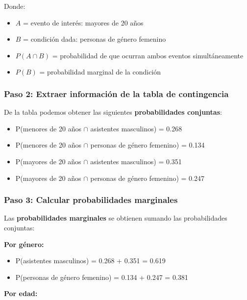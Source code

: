 \documentclass[
]{article}
\providecommand{\tightlist}{%
  \setlength{\itemsep}{0pt}\setlength{\parskip}{0pt}}
\begin{document}
Donde:

\begin{itemize}
\tightlist
\item
  \(A\) = evento de interés: mayores de 20 años
\item
  \(B\) = condición dada: personas de género femenino
\item
  \(P(A \cap B)\) = probabilidad de que ocurran ambos eventos
  simultáneamente
\item
  \(P(B)\) = probabilidad marginal de la condición
\end{itemize}

\subsubsection{Paso 2: Extraer información de la tabla de
contingencia}\label{paso-2-extraer-informaciuxf3n-de-la-tabla-de-contingencia}

De la tabla podemos obtener las siguientes \textbf{probabilidades
conjuntas}:

\begin{itemize}
\tightlist
\item
  P(menores de 20 años \(\cap\) asistentes masculinos) = 0.268
\item
  P(menores de 20 años \(\cap\) personas de género femenino) = 0.134
\item
  P(mayores de 20 años \(\cap\) asistentes masculinos) = 0.351
\item
  P(mayores de 20 años \(\cap\) personas de género femenino) = 0.247
\end{itemize}

\subsubsection{Paso 3: Calcular probabilidades
marginales}\label{paso-3-calcular-probabilidades-marginales}

Las \textbf{probabilidades marginales} se obtienen sumando las
probabilidades conjuntas:

\textbf{Por género:}

\begin{itemize}
\tightlist
\item
  P(asistentes masculinos) = 0.268 + 0.351 = 0.619
\item
  P(personas de género femenino) = 0.134 + 0.247 = 0.381
\end{itemize}

\textbf{Por edad:}
\end{document}
